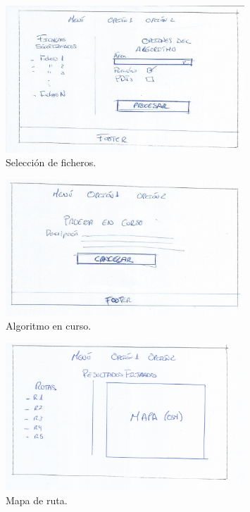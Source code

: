 \begin{figure}[!htbp]
  \centering
    \includegraphics[width=0.8\textwidth]{../img/prototipado/baja/ficheros.png}
  \caption{Selección de ficheros.}
  \label{ficheros}
\end{figure}

\begin{figure}[!htbp]
  \centering
    \includegraphics[width=0.8\textwidth]{../img/prototipado/baja/encurso.png}
  \caption{Algoritmo en curso.}
  \label{encurso}
\end{figure}

\begin{figure}[!htbp]
  \centering
    \includegraphics[width=0.8\textwidth]{../img/prototipado/baja/mapa.png}
  \caption{Mapa de ruta.}
  \label{mapa}
\end{figure}

